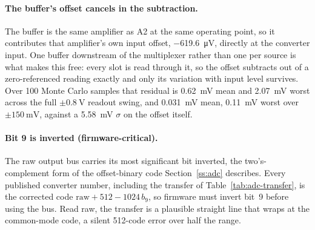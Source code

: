 \paragraph{The buffer's offset cancels in the subtraction.} The buffer is the
same amplifier as A2 at the same operating point, so it contributes that
amplifier's own input offset, \SI{-619.6}{\micro\volt}, directly at the
converter input. One buffer downstream of the multiplexer rather than one per
source is what makes this free: every slot is read through it, so the offset
subtracts out of a zero-referenced reading exactly and only its variation with
input level survives. Over 100 Monte Carlo samples that residual is
\SI{0.62}{\milli\volt} mean and \SI{2.07}{\milli\volt} worst across the full
\(\pm\SI{0.8}{\volt}\) readout swing, and \SI{0.031}{\milli\volt} mean,
\SI{0.11}{\milli\volt} worst over \(\pm\SI{150}{\milli\volt}\), against a
\SI{5.58}{\milli\volt} \(\sigma\) on the offset itself.

\paragraph{Bit 9 is inverted (firmware-critical).} The raw output bus carries
its most significant bit inverted, the two's-complement form of the
offset-binary code Section~\ref{ss:adc} describes. Every published converter
number, including the transfer of Table~\ref{tab:adc-transfer}, is the
corrected code \(\mathrm{raw} + 512 - 1024\,b_9\), so firmware must invert bit~9
before using the bus. Read raw, the transfer is a plausible straight line that wraps at the
common-mode code, a silent 512-code error over half the range.
